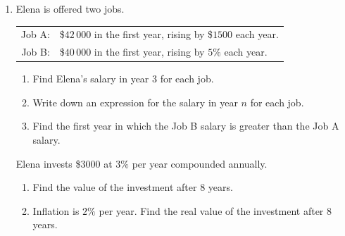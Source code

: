 \documentclass[12pt, twoside]{article}
\begin{document}
\begin{enumerate}[itemsep=0.15cm]
\newpage

\item[4.]

Elena is offered two jobs.

\begin{center}
\begin{tabular}{rl}
Job A: & \$$42\,000$ in the first year, rising by \$$1500$ each year. \\[2pt]
Job B: & \$$40\,000$ in the first year, rising by $5\%$ each year. \\
\end{tabular}
\end{center}

\begin{enumerate}[itemsep=0.1cm]
  \item Find Elena's salary in year $3$ for each job.
  \item Write down an expression for the salary in year $n$ for each job.
  \item Find the first year in which the Job B salary is greater than the
  Job A salary.
\end{enumerate}

Elena invests \$$3000$ at $3\%$ per year compounded annually.

\begin{enumerate}[itemsep=0.1cm]
  \item[(d)] Find the value of the investment after $8$ years.
  \item[(e)] Inflation is $2\%$ per year. Find the real value of the
  investment after $8$ years.
\end{enumerate}


\end{enumerate}
\end{document}
